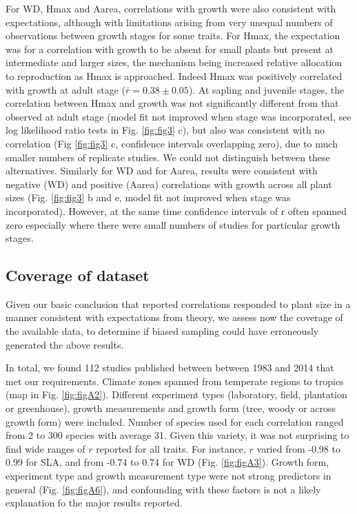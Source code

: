 \documentclass[a4paper,11pt]{article}
\begin{document}
For WD, Hmax and Aarea, correlations with growth were also consistent with expectations, although with limitations arising from very unequal numbers of observations between growth stages for some traits. For Hmax, the expectation was for a correlation with growth to be absent for small plants but present at intermediate and larger sizes, the mechanism being increased relative allocation to reproduction as Hmax is approached. Indeed Hmax was positively correlated with growth at adult stage ($\bar{r}= 0.38 \pm 0.05$). At sapling and juvenile stages, the correlation between Hmax and growth was not significantly different from that observed at adult stage (model fit not improved when stage was incorporated, see log likelihood ratio tests in Fig. \ref{fig:fig3} c), but also was consistent with no correlation (Fig \ref{fig:fig3} c, confidence intervals overlapping zero), due to much smaller numbers of replicate studies. We could not distinguish between these alternatives. Similarly for WD and for Aarea, results were consistent with negative (WD) and positive (Aarea) correlations with growth across all plant sizes (Fig. \ref{fig:fig3} b and e, model fit not improved when stage was incorporated). However, at the same time confidence intervals of r often spanned zero especially where there were small numbers of studies for particular growth stages.



\subsection*{Coverage of dataset}

Given our basic conclusion that reported correlations responded to plant size in a manner consistent with expectations from theory, we assess now the coverage of the available data, to determine if biased sampling could have erroneously generated the above results.

In total, we found 112 studies published between between 1983 and 2014 that met our requirements. Climate zones spanned from temperate regions to  tropics (map in Fig. \ref{fig:figA2}). Different experiment types (laboratory, field, plantation or greenhouse), growth measurements and growth form (tree, woody or across growth form) were included. Number of species used for each correlation ranged from 2 to 300 species with average 31. Given this variety, it was not surprising to find wide ranges of $r$ reported for all traits. For instance, $r$ varied from -0.98 to 0.99 for SLA, and from -0.74 to 0.74 for WD (Fig. \ref{fig:figA3}). Growth form, experiment type and growth measurement type were not strong predictors in general (Fig. \ref{fig:figA6}), and confounding with these factors is not a likely explanation fo the major results reported.
\end{document}
